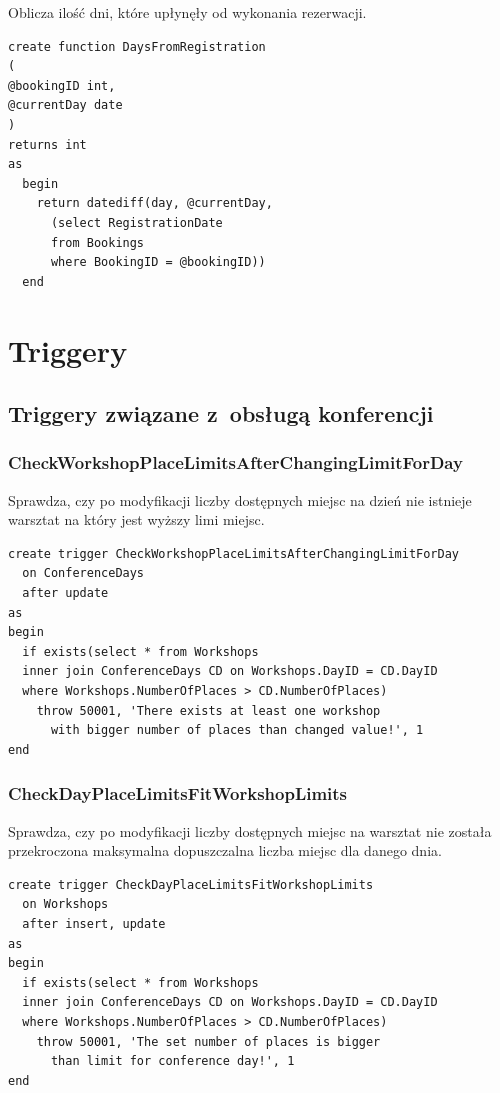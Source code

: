 \documentclass[12pt, a4paper]{mwrep}
\begin{document}
\noindent Oblicza ilość dni, które upłynęły od wykonania rezerwacji.
\begin{lstlisting}
create function DaysFromRegistration
(
@bookingID int,
@currentDay date
)
returns int
as
  begin
    return datediff(day, @currentDay,
      (select RegistrationDate 
      from Bookings 
      where BookingID = @bookingID))
  end
\end{lstlisting}

\chapter{Triggery}

\section{Triggery związane z~obsługą konferencji}

\subsection{CheckWorkshopPlaceLimitsAfterChangingLimitForDay}

\noindent Sprawdza, czy po modyfikacji liczby dostępnych miejsc na dzień nie istnieje warsztat na który jest wyższy limi miejsc.

\begin{lstlisting}
create trigger CheckWorkshopPlaceLimitsAfterChangingLimitForDay
  on ConferenceDays
  after update
as
begin
  if exists(select * from Workshops
  inner join ConferenceDays CD on Workshops.DayID = CD.DayID
  where Workshops.NumberOfPlaces > CD.NumberOfPlaces)
    throw 50001, 'There exists at least one workshop 
      with bigger number of places than changed value!', 1
end
\end{lstlisting}

\subsection{CheckDayPlaceLimitsFitWorkshopLimits}

\noindent Sprawdza, czy po modyfikacji liczby dostępnych miejsc na warsztat nie została przekroczona maksymalna dopuszczalna liczba miejsc dla danego dnia.

\begin{lstlisting}
create trigger CheckDayPlaceLimitsFitWorkshopLimits
  on Workshops
  after insert, update
as
begin
  if exists(select * from Workshops
  inner join ConferenceDays CD on Workshops.DayID = CD.DayID
  where Workshops.NumberOfPlaces > CD.NumberOfPlaces)
    throw 50001, 'The set number of places is bigger 
      than limit for conference day!', 1
end
\end{lstlisting}
\end{document}
